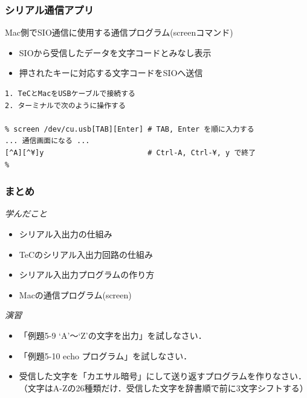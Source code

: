 \documentclass[handout]{beamer}        %
\begin{document}
\begin{frame}[fragile]
  \frametitle{シリアル通信アプリ}
  Mac側でSIO通信に使用する通信プログラム(screenコマンド)
  \begin{itemize}
    \item SIOから受信したデータを文字コードとみなし表示
    \item 押されたキーに対応する文字コードをSIOへ送信
  \end{itemize}

\begin{framed}{\small
\begin{verbatim}
1. TeCとMacをUSBケーブルで接続する
2. ターミナルで次のように操作する

% screen /dev/cu.usb[TAB][Enter] # TAB, Enter を順に入力する
... 通信画面になる ...
[^A][^¥]y                        # Ctrl-A, Ctrl-¥, y で終了
%
\end{verbatim}
}\end{framed}
\end{frame}

\begin{frame}
  \frametitle{まとめ}
  \emph{学んだこと}
  \begin{itemize}
  \item シリアル入出力の仕組み
  \item TeCのシリアル入出力回路の仕組み
  \item シリアル入出力プログラムの作り方
  \item Macの通信プログラム(screen)
  \end{itemize}
  \vfill
  \emph{演習}
  \begin{itemize}
  \item 「例題5-9 `A'〜`Z'の文字を出力」を試しなさい．
  \item 「例題5-10 echo プログラム」を試しなさい．
  \item 受信した文字を「カエサル暗号」にして送り返すプログラムを作りなさい．
  （文字はA-Zの26種類だけ．受信した文字を辞書順で前に3文字シフトする）
  \end{itemize}
  \vfill
\end{frame}
\end{document}
